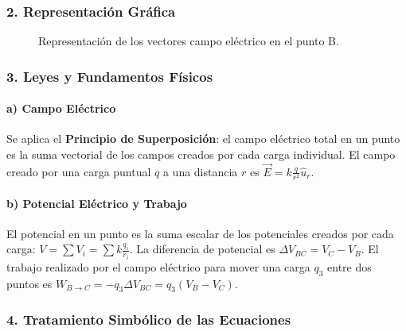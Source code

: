 \subsubsection*{2. Representación Gráfica}
\begin{figure}[H]
    \centering
    \caption{Representación de los vectores campo eléctrico en el punto B.}
\end{figure}

\subsubsection*{3. Leyes y Fundamentos Físicos}
\paragraph*{a) Campo Eléctrico}
Se aplica el \textbf{Principio de Superposición}: el campo eléctrico total en un punto es la suma vectorial de los campos creados por cada carga individual. El campo creado por una carga puntual $q$ a una distancia $r$ es $\vec{E} = k \frac{q}{r^2}\hat{u}_r$.
\paragraph*{b) Potencial Eléctrico y Trabajo}
El potencial en un punto es la suma escalar de los potenciales creados por cada carga: $V = \sum V_i = \sum k \frac{q_i}{r_i}$. La diferencia de potencial es $\Delta V_{BC} = V_C - V_B$. El trabajo realizado por el campo eléctrico para mover una carga $q_3$ entre dos puntos es $W_{B \to C} = -q_3 \Delta V_{BC} = q_3(V_B - V_C)$.

\subsubsection*{4. Tratamiento Simbólico de las Ecuaciones}
